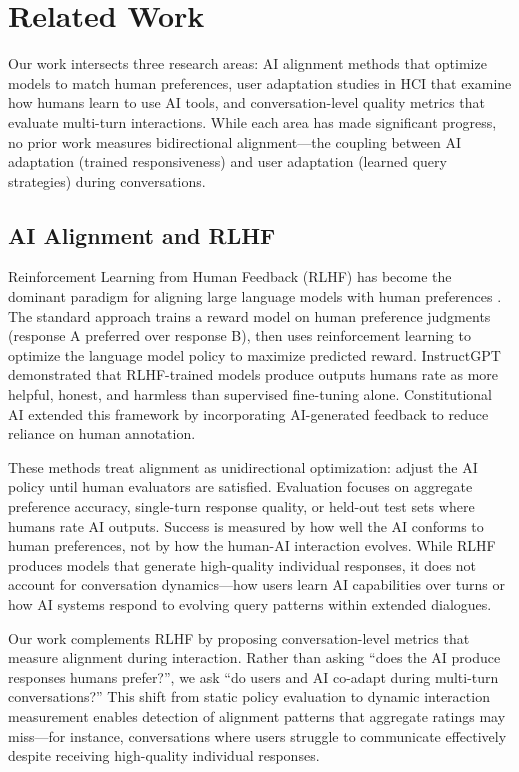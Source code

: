 \section{Related Work}
\label{sec:related}

Our work intersects three research areas: AI alignment methods that optimize models to match human preferences, user adaptation studies in HCI that examine how humans learn to use AI tools, and conversation-level quality metrics that evaluate multi-turn interactions. While each area has made significant progress, no prior work measures bidirectional alignment---the coupling between AI adaptation (trained responsiveness) and user adaptation (learned query strategies) during conversations.

\subsection{AI Alignment and RLHF}

Reinforcement Learning from Human Feedback (RLHF) has become the dominant paradigm for aligning large language models with human preferences \cite{christiano2017deep, ouyang2022training}. The standard approach trains a reward model on human preference judgments (response A preferred over response B), then uses reinforcement learning to optimize the language model policy to maximize predicted reward. InstructGPT \cite{ouyang2022training} demonstrated that RLHF-trained models produce outputs humans rate as more helpful, honest, and harmless than supervised fine-tuning alone. Constitutional AI \cite{bai2022constitutional} extended this framework by incorporating AI-generated feedback to reduce reliance on human annotation.

These methods treat alignment as unidirectional optimization: adjust the AI policy until human evaluators are satisfied. Evaluation focuses on aggregate preference accuracy, single-turn response quality, or held-out test sets where humans rate AI outputs. Success is measured by how well the AI conforms to human preferences, not by how the human-AI interaction evolves. While RLHF produces models that generate high-quality individual responses, it does not account for conversation dynamics---how users learn AI capabilities over turns or how AI systems respond to evolving query patterns within extended dialogues.

Our work complements RLHF by proposing conversation-level metrics that measure alignment during interaction. Rather than asking ``does the AI produce responses humans prefer?'', we ask ``do users and AI co-adapt during multi-turn conversations?'' This shift from static policy evaluation to dynamic interaction measurement enables detection of alignment patterns that aggregate ratings may miss---for instance, conversations where users struggle to communicate effectively despite receiving high-quality individual responses.

